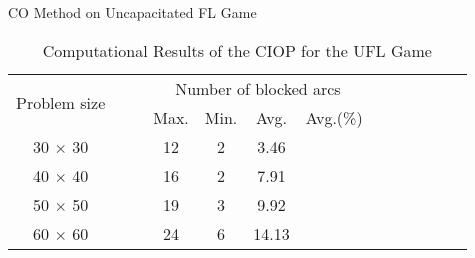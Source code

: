 \documentclass[14pt]{beamer}
\begin{document}
\begin{frame}{CO Method on Uncapacitated FL Game}
\small
\begin{table}[H]
\centering
\footnotesize
\tabcolsep=12pt
\renewcommand\arraystretch{1.6}
\caption{\label{table:toll} Computational Results of the CIOP for the UFL Game}
\begin{tabular}[!h]{c c c c c c c c c c c c c}
\hline
\multirow{2}{*}{Problem size}  &\multicolumn{1}{c}{}	&\multicolumn{1}{c}{} & \multicolumn{4}{c}{Number of blocked arcs}\\
\cline{4-7}
 &&	&Max.	&Min.	&Avg.	&Avg.(\%)\\
\hline
30 $\times$ 30	&	 &	&12		&2	&3.46	&{\color{red}{0.427}}\\
40 $\times$ 40	&	 &	&16		&2	&7.91	&{\color{red}{0.475}}\\
50 $\times$ 50	&	 &	&19		&3	&9.92	&{\color{red}{0.389}}\\
60 $\times$ 60	&	 &	&24		&6	&14.13	&{\color{red}{0.401}}\\
\hline
\end{tabular}
\end{table}\end{frame}
\end{document}
